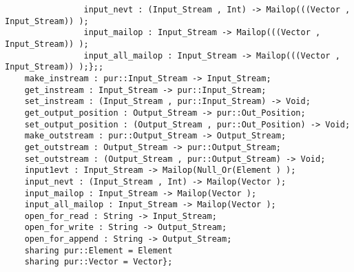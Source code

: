 \begin{verbatim}
                input_nevt : (Input_Stream , Int) -> Mailop(((Vector , Input_Stream)) );
                input_mailop : Input_Stream -> Mailop(((Vector , Input_Stream)) );
                input_all_mailop : Input_Stream -> Mailop(((Vector , Input_Stream)) );};;
    make_instream : pur::Input_Stream -> Input_Stream;
    get_instream : Input_Stream -> pur::Input_Stream;
    set_instream : (Input_Stream , pur::Input_Stream) -> Void;
    get_output_position : Output_Stream -> pur::Out_Position;
    set_output_position : (Output_Stream , pur::Out_Position) -> Void;
    make_outstream : pur::Output_Stream -> Output_Stream;
    get_outstream : Output_Stream -> pur::Output_Stream;
    set_outstream : (Output_Stream , pur::Output_Stream) -> Void;
    input1evt : Input_Stream -> Mailop(Null_Or(Element ) );
    input_nevt : (Input_Stream , Int) -> Mailop(Vector );
    input_mailop : Input_Stream -> Mailop(Vector );
    input_all_mailop : Input_Stream -> Mailop(Vector );
    open_for_read : String -> Input_Stream;
    open_for_write : String -> Output_Stream;
    open_for_append : String -> Output_Stream;
    sharing pur::Element = Element
    sharing pur::Vector = Vector};
\end{verbatim}
